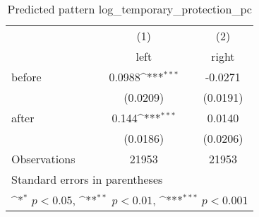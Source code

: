 \begin{table}[htbp]\centering
\def\sym#1{\ifmmode^{#1}\else\(^{#1}\)\fi}
\caption{Predicted pattern log\_temporary\_protection\_pc}
\begin{tabular}{l*{2}{c}}
\hline\hline
                    &\multicolumn{1}{c}{(1)}&\multicolumn{1}{c}{(2)}\\
                    &\multicolumn{1}{c}{left}&\multicolumn{1}{c}{right}\\
\hline
before              &      0.0988\sym{***}&     -0.0271         \\
                    &    (0.0209)         &    (0.0191)         \\
[1em]
after               &       0.144\sym{***}&      0.0140         \\
                    &    (0.0186)         &    (0.0206)         \\
\hline
Observations        &       21953         &       21953         \\
\hline\hline
\multicolumn{3}{l}{\footnotesize Standard errors in parentheses}\\
\multicolumn{3}{l}{\footnotesize \sym{*} \(p<0.05\), \sym{**} \(p<0.01\), \sym{***} \(p<0.001\)}\\
\end{tabular}
\end{table}
